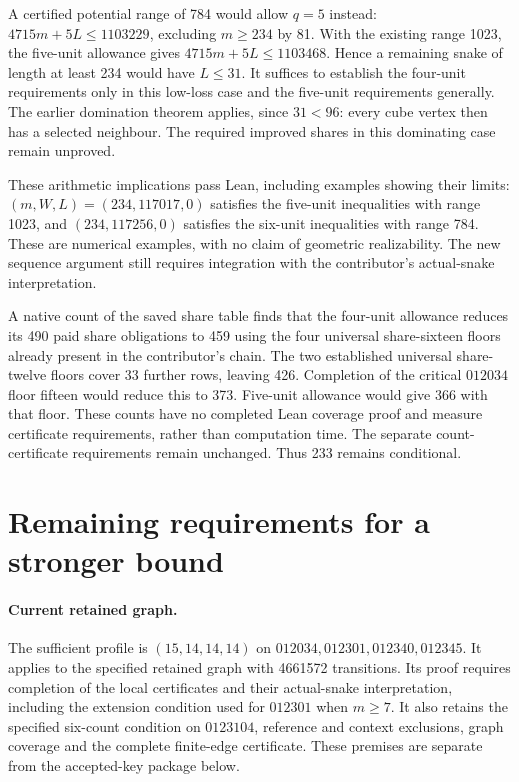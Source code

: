 \documentclass[11pt,a4paper]{article}
\theoremstyle{definition}
\theoremstyle{remark}
\begin{document}
A certified potential range of 784 would allow $q=5$ instead:
$4715m+5L\le1103229$, excluding $m\ge234$ by 81. With the existing
range 1023, the five-unit allowance gives
$4715m+5L\le1103468$. Hence a remaining snake of length at least 234
would have $L\le31$. It suffices to establish the four-unit requirements
only in this low-loss case and the five-unit requirements generally.
The earlier domination theorem applies, since $31<96$: every cube vertex
then has a selected neighbour. The required improved shares in this
dominating case remain unproved.

These arithmetic implications pass Lean, including examples showing their
limits: $(m,W,L)=(234,117017,0)$ satisfies the five-unit inequalities with
range 1023, and $(234,117256,0)$ satisfies the six-unit inequalities with
range 784. These are numerical examples, with no claim of geometric
realizability. The new sequence argument still requires integration with
the contributor's actual-snake interpretation.

A native count of the saved share table finds that the four-unit allowance
reduces its 490 paid share obligations to 459 using the four universal
share-sixteen floors already present in the contributor's chain.
The two established universal share-twelve floors cover 33 further rows,
leaving 426. Completion of the critical $012034$ floor fifteen would
reduce this to 373. Five-unit allowance would give 366 with that floor.
These counts have no completed Lean coverage proof and measure certificate
requirements, rather than computation time. The separate count-certificate
requirements remain unchanged. Thus 233 remains conditional.

\section{Remaining requirements for a stronger bound}\label{sec:closure}

\paragraph{Current retained graph.}
The sufficient profile is $(15,14,14,14)$ on
$012034,012301,012340,012345$. It applies to the specified retained
graph with 4661572 transitions. Its proof requires completion of the local
certificates and their actual-snake interpretation, including the
extension condition used for $012301$ when $m\ge7$. It also retains the
specified six-count condition on $0123104$, reference and context
exclusions, graph coverage and the complete finite-edge certificate.
These premises are separate from the accepted-key package below.
\end{document}
